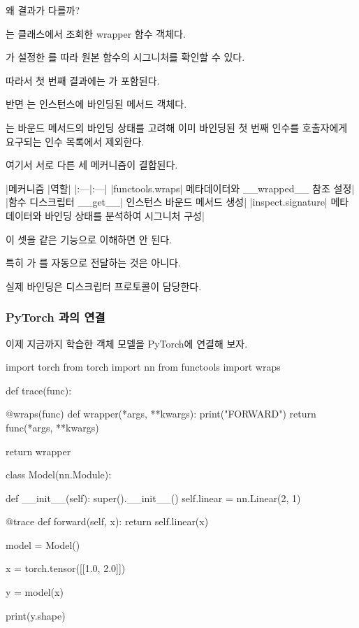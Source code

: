 왜 결과가 다를까?

는 클래스에서 조회한 wrapper 함수 객체다.

가 설정한 를 따라 원본 함수의 시그니처를 확인할 수 있다.

따라서 첫 번째 결과에는 가 포함된다.

반면 는 인스턴스에 바인딩된 메서드 객체다.

는 바운드 메서드의 바인딩 상태를 고려해 이미 바인딩된 첫 번째 인수를 호출자에게 요구되는 인수 목록에서 제외한다.

여기서 서로 다른 세 메커니즘이 결합된다.

\begin{dhktable}
|메커니즘	|역할|
|:---|:---|
|functools.wraps|	메타데이터와 __wrapped__ 참조 설정|
|함수 디스크립터 __get__|	인스턴스 바운드 메서드 생성|
|inspect.signature|	메타데이터와 바인딩 상태를 분석하여 시그니처 구성|
\end{dhktable}

이 셋을 같은 기능으로 이해하면 안 된다.

특히 가 를 자동으로 전달하는 것은 아니다.

실제 바인딩은 디스크립터 프로토콜이 담당한다.

\subsubsection{PyTorch 과의 연결}

이제 지금까지 학습한 객체 모델을 PyTorch에 연결해 보자.

\begin{dhkcode}
import torch
from torch import nn
from functools import wraps


def trace(func):

    @wraps(func)
    def wrapper(*args, **kwargs):
        print("FORWARD")
        return func(*args, **kwargs)

    return wrapper


class Model(nn.Module):

    def __init__(self):
        super().__init__()
        self.linear = nn.Linear(2, 1)

    @trace
    def forward(self, x):
        return self.linear(x)


model = Model()

x = torch.tensor([[1.0, 2.0]])

y = model(x)

print(y.shape)
\end{dhkcode}

